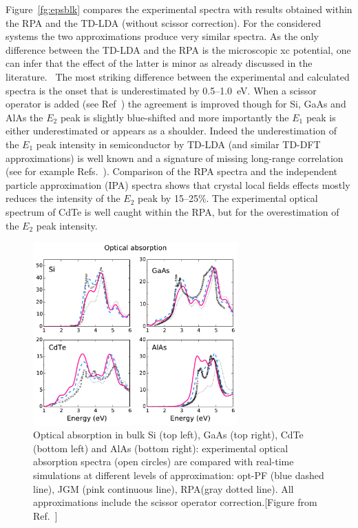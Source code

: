 Figure~\ref{fg:epsblk} compares the experimental spectra with results obtained within the RPA and the TD-LDA (without scissor correction). For the considered systems the two approximations produce very similar spectra. As the only difference between the TD-LDA and the RPA is the microscopic xc potential, one can infer that the effect of the latter is minor as already discussed in the literature.~\cite{botti2007time,Onida} 
The most striking difference between the experimental and calculated spectra is the onset that is underestimated by 0.5--1.0~eV. When a scissor operator is added (see Ref~\cite{gruningtddf1}) the agreement is improved though for Si, GaAs and AlAs the $E_2$ peak is slightly blue-shifted and more importantly the $E_1$ peak is either underestimated or appears as a shoulder. Indeed the underestimation of the $E_1$ peak intensity in semiconductor by TD-LDA (and similar TD-DFT approximations) is well known and a signature of missing long-range correlation (see for example Refs.~\cite{PhysRevLett.43.387,PhysRevB.21.4656,botti2007time,Onida}). 
Comparison of the RPA spectra and the independent particle approximation (IPA) spectra shows that crystal local fields effects mostly reduces the intensity of the $E_2$ peak by 15--25\%.  
The experimental optical spectrum of CdTe is well caught within the RPA, but for the overestimation of the $E_2$ peak intensity.  

\begin{figure}[t]
\centering
\includegraphics[width=0.7\textwidth]{Figures/Abs2.pdf}
\caption{\footnotesize{Optical absorption in bulk Si (top left), GaAs (top right), CdTe (bottom left) and AlAs (bottom right): experimental optical absorption spectra (open circles) are compared with real-time simulations at different levels of approximation: opt-PF (blue dashed line), JGM (pink continuous line), RPA(gray dotted line). All approximations include the scissor operator correction.[Figure from Ref.~\cite{gruningtddf1}] }} \label{fg:epsblk1}
\end{figure}


